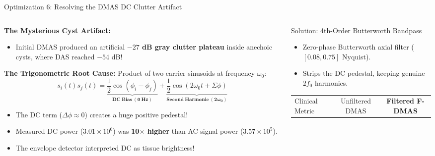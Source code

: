 \documentclass[aspectratio=169,10pt]{beamer}
\begin{document}
\begin{frame}{Optimization 6: Resolving the DMAS DC Clutter Artifact}
  \begin{columns}[T]
    \begin{column}{0.5\textwidth}
      \textbf{\small The Mysterious Cyst Artifact:}
      \scriptsize
      \begin{itemize}
        \item Initial DMAS produced an artificial \textbf{$-27$ dB gray clutter plateau} inside anechoic cysts, where DAS reached $-54$ dB!
      \end{itemize}
      \textbf{\small The Trigonometric Root Cause:}
      \scriptsize
      Product of two carrier sinusoids at frequency $\omega_0$:
      $$s_i(t) s_j(t) = \underbrace{\frac{1}{2}\cos(\phi_i - \phi_j)}_{\mathbf{DC\ Bias\ (0\ Hz)}} + \underbrace{\frac{1}{2}\cos(2\omega_0 t + \Sigma \phi)}_{\mathbf{Second\ Harmonic\ (2\omega_0)}}$$
      \begin{itemize}
        \item The DC term ($\Delta \phi \approx 0$) creates a huge positive pedestal!
        \item Measured DC power ($3.01 \times 10^6$) was \textbf{10$\times$ higher} than AC signal power ($3.57 \times 10^5$).
        \item The envelope detector interpreted DC as tissue brightness!
      \end{itemize}
    \end{column}
    \begin{column}{0.5\textwidth}
      \begin{block}{Solution: 4th-Order Butterworth Bandpass}
        \scriptsize
        \begin{itemize}
          \item Zero-phase Butterworth axial filter ($[0.08, 0.75]$ Nyquist).
          \item Strips the DC pedestal, keeping genuine $2f_0$ harmonics.
        \end{itemize}
      \end{block}
      \begin{table}
        \centering
        \tiny
        \begin{tabular}{@{}lcc@{}}
          \toprule
          Clinical Metric & Unfiltered DMAS & \textbf{Filtered F-DMAS} \\

\end{tabular}
\end{table}
\end{column}
\end{columns}
\end{frame}
\end{document}
